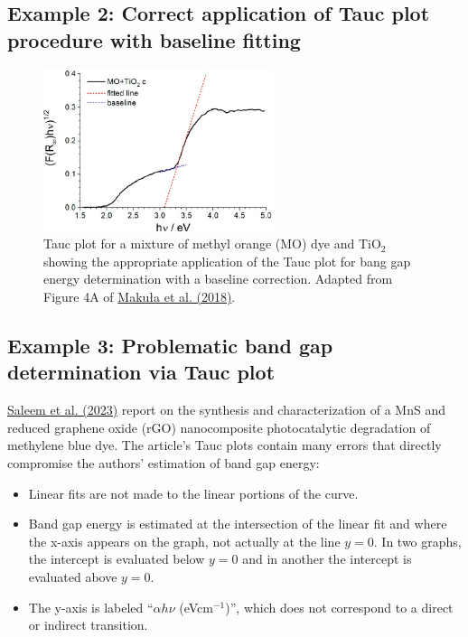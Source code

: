 \documentclass[letterpaper, 12pt]{article}
\begin{document}
\pagebreak

\subsection*{Example 2: Correct application of Tauc plot procedure with baseline fitting}

\begin{figure}[h!tbp]
    \centering
    \includegraphics[width=0.6\textwidth]{img/tauc/images_large_jz-2018-02892b_0004.jpeg}
    \caption*{Tauc plot for a mixture of methyl orange (MO) dye and TiO$_2$ showing the appropriate application of the Tauc plot for bang gap energy determination with a baseline correction. Adapted from Figure 4A of \href{https://doi.org/10.1021/acs.jpclett.8b02892}{Maku\l{}a et al. (2018)}.}
\end{figure}

\subsection*{Example 3: Problematic band gap determination via Tauc plot}

\href{https://doi.org/10.1002/pssa.202200734}{Saleem et al. (2023)} report on the synthesis and characterization of a MnS and reduced graphene oxide (rGO) nanocomposite photocatalytic degradation of methylene blue dye. The article's Tauc plots contain many errors that directly compromise the authors' estimation of band gap energy:

\begin{itemize}
    \setlength\itemsep{-0.5em}
    \item Linear fits are not made to the linear portions of the curve.
    \item Band gap energy is estimated at the intersection of the linear fit and where the x-axis appears on the graph, not actually at the line $y = 0$. In two graphs, the intercept is evaluated below $y = 0$ and in another the intercept is evaluated above $y = 0$.
    \item The y-axis is labeled ``$\alpha h \nu$ (eVcm$^{-1}$)'', which does not correspond to a direct or indirect transition.
\end{itemize}
\end{document}
